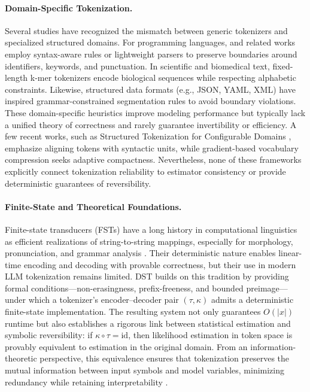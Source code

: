 \paragraph{Domain-Specific Tokenization.}
Several studies have recognized the mismatch between generic tokenizers and specialized structured domains.
For programming languages, \citet{Jiang2023CodeT5Plus} and related works employ syntax-aware rules or lightweight parsers to preserve boundaries around identifiers, keywords, and punctuation.
In scientific and biomedical text, fixed-length k-mer tokenizers \citep{Ji2021BioBERT, Brandes2022ProteinBERT} encode biological sequences while respecting alphabetic constraints.
Likewise, structured data formats (e.g., JSON, YAML, XML) have inspired grammar-constrained segmentation rules to avoid boundary violations.
These domain-specific heuristics improve modeling performance but typically lack a unified theory of correctness and rarely guarantee invertibility or efficiency.
A few recent works, such as Structured Tokenization for Configurable Domains \citep{Xu2024StructuredTokenization}, emphasize aligning tokens with syntactic units, while gradient-based vocabulary compression \citep{Wei2024VocabCompression} seeks adaptive compactness.
Nevertheless, none of these frameworks explicitly connect tokenization reliability to estimator consistency or provide deterministic guarantees of reversibility.

\paragraph{Finite-State and Theoretical Foundations.}
Finite-state transducers (FSTs) have a long history in computational linguistics as efficient realizations of string-to-string mappings, especially for morphology, pronunciation, and grammar analysis \citep{Mohri2004FST,Roark2011GrammarTokenization}.
Their deterministic nature enables linear-time encoding and decoding with provable correctness, but their use in modern LLM tokenization remains limited.
DST builds on this tradition by providing formal conditions—non-erasingness, prefix-freeness, and bounded preimage—under which a tokenizer’s encoder–decoder pair $(\tau,\kappa)$ admits a deterministic finite-state implementation.
The resulting system not only guarantees $O(|x|)$ runtime but also establishes a rigorous link between statistical estimation and symbolic reversibility:
if $\kappa\circ\tau=\mathrm{id}$, then likelihood estimation in token space is provably equivalent to estimation in the original domain.
From an information-theoretic perspective, this equivalence ensures that tokenization preserves the mutual information between input symbols and model variables, minimizing redundancy while retaining interpretability \citep{JurafskyMartin2023SpeechNLP,Ding2023ByteLevelTradeoff}.


